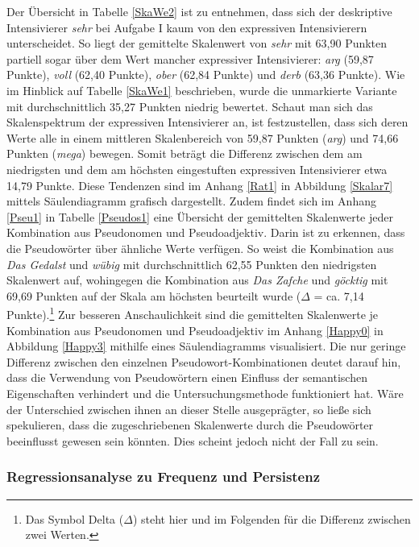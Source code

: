 %
\noindent Der Übersicht in Tabelle \ref{SkaWe2} ist zu entnehmen, dass sich der deskriptive Intensivierer \textit{sehr} bei Aufgabe I kaum von den expressiven Intensivierern unterscheidet. So liegt der gemittelte Skalenwert von \textit{sehr} mit 63,90 Punkten partiell sogar über dem Wert mancher expressiver Intensivierer: {\textit{arg} (59,87 Punkte)}, {\textit{voll} (62,40 Punkte)}, {\textit{ober} (62,84 Punkte)} und \textit{derb} (63,36 Punkte). Wie im Hinblick auf {Tabelle \ref{SkaWe1}} beschrieben, wurde die unmarkierte Variante mit durchschnittlich 35,27 Punkten niedrig bewertet. Schaut man sich das Skalenspektrum der expressiven Intensivierer an, ist festzustellen, dass sich deren Werte alle in einem mittleren Skalenbereich von {59,87 Punkten (\textit{arg})} und 74,66 Punkten (\textit{mega}) bewegen. Somit beträgt die Differenz zwischen dem am niedrigsten und dem am höchsten eingestuften expressiven Intensivierer etwa 14,79 Punkte. Diese Tendenzen sind im {Anhang \ref{Rat1}} in {Abbildung \ref{Skalar7}} mittels Säulendiagramm grafisch dargestellt. Zudem findet sich im {Anhang \ref{Pseu1}} in {Tabelle \ref{Pseudos1}} eine Übersicht der gemittelten Skalenwerte jeder Kombination aus Pseudonomen und Pseudoadjektiv. Darin ist zu erkennen, dass die Pseudowörter über ähnliche Werte verfügen. So weist die Kombination aus \textit{Das Gedalst} und \textit{wübig} mit durchschnittlich 62,55 Punkten den niedrigsten Skalenwert auf, wohingegen die Kombination aus \textit{Das Zafche} und \textit{göcktig} mit 69,69 Punkten auf der Skala am höchsten beurteilt wurde ($\Delta$ = ca. 7,14 Punkte).\footnote{Das Symbol Delta ($\Delta$) steht hier und im Folgenden für die Differenz zwischen zwei Werten.} Zur besseren Anschaulichkeit sind die gemittelten Skalenwerte je Kombination aus Pseudonomen und Pseudoadjektiv im Anhang \ref{Happy0} in {Abbildung \ref{Happy3}} mithilfe eines Säulendiagramms visualisiert. Die nur geringe Differenz zwischen den einzelnen Pseudowort-Kombinationen deutet darauf hin, dass die Verwendung von Pseudowörtern einen Einfluss der semantischen Eigenschaften verhindert und die Untersuchungsmethode funktioniert hat. Wäre der Unterschied zwischen ihnen an dieser Stelle ausgeprägter, so ließe sich spekulieren, dass die zugeschriebenen Skalenwerte durch die Pseudowörter beeinflusst gewesen sein könnten. Dies scheint jedoch nicht der Fall zu sein.


\subsubsection{Regressionsanalyse zu Frequenz und Persistenz}


